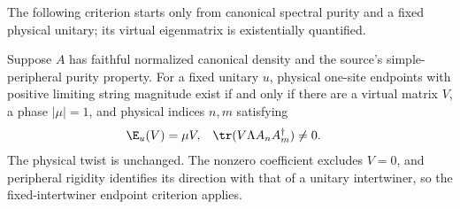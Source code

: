 The following criterion starts only from canonical spectral purity and a
fixed physical unitary; its virtual eigenmatrix is existentially quantified.

\begin{lemma}
    \label{thm:physical_string_peripheral_letter_criterion}
    \leanok
    Suppose $A$ has faithful normalized canonical density and the source's
    simple-peripheral purity property. For a fixed unitary $u$, physical
    one-site endpoints with positive limiting string magnitude exist if
    and only if there are a virtual matrix $V$, a phase $|\mu|=1$, and
    physical indices $n,m$ satisfying
    \begin{align}
        \E_u(V) & =\mu V,
                & \tr(V\Lambda A_nA_m^\dagger) & \ne0.
        \notag
    \end{align}
    The physical twist is unchanged. The nonzero coefficient excludes
    $V=0$, and peripheral rigidity identifies its direction with that of
    a unitary intertwiner, so the fixed-intertwiner endpoint criterion applies.
\end{lemma}
